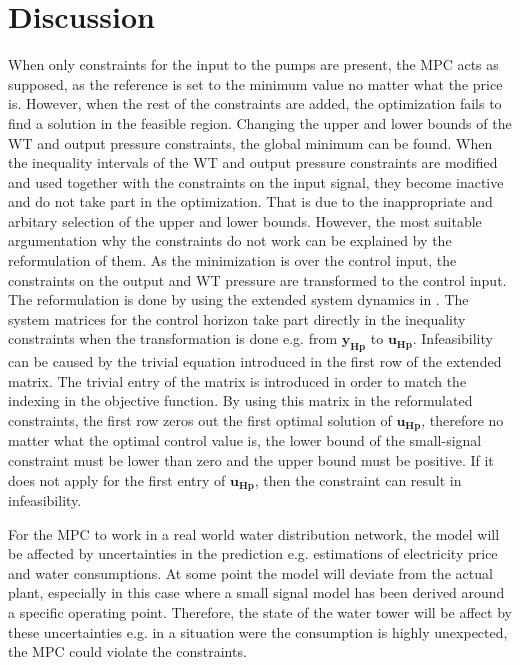 \chapter{Discussion}
\label{Discussion}

When only constraints for the input to the pumps are present, the MPC acts as supposed, as the reference is set to the minimum value no matter what the price is. However, when the rest of the constraints are added, the optimization fails to find a solution in the feasible region. Changing the upper and lower bounds of the WT and output pressure constraints, the global minimum can be found. When the inequality intervals of the WT and output pressure constraints are modified and used together with the constraints on the input signal, they become inactive and do not take part in the optimization. That is due to the inappropriate and arbitary selection of the upper and lower bounds. 
However, the most suitable argumentation why the constraints do not work can be explained by the reformulation of them. As the minimization is over the control input, the constraints on the output and WT pressure are transformed to the control input. The reformulation is done by using the extended system dynamics in . The system matrices for the control horizon take part directly in the inequality constraints when the transformation is done e.g. from $\bm{y_{Hp}}$ to $\bm{u_{Hp}}$. Infeasibility can be caused by the trivial equation introduced in the first row of the extended matrix. The trivial entry of the matrix is introduced in order to match the indexing in the objective function. By using this matrix in the reformulated constraints, the first row zeros out the first optimal solution of $\bm{u_{Hp}}$, therefore no matter what the optimal control value is, the lower bound of the small-signal constraint must be lower than zero and the upper bound must be positive. If it does not apply for the first entry of $\bm{u_{Hp}}$, then the constraint can result in infeasibility. 

For the MPC to work in a real world water distribution network, the model will be affected by uncertainties in the prediction e.g. estimations of electricity price and water consumptions. At some point the model will deviate from the actual plant, especially in this case where a small signal model has been derived around a specific operating point. Therefore, the state of the water tower will be affect by these uncertainties e.g. in a situation were the consumption is highly unexpected, the MPC could violate the constraints.

